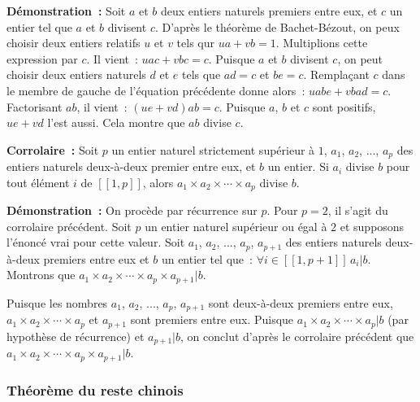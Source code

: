 \medskip

\noindent\textbf{Démonstration :} 
    Soit $a$ et $b$ deux entiers naturels premiers entre eux, et $c$ un entier tel que $a$ et $b$ divisent $c$.
    D'après le théorème de Bachet-Bézout, on peux choisir deux entiers relatifs $u$ et $v$ tels qur $u a + v b = 1$. 
    Multiplions cette expression par $c$. Il vient : $u a c + v b c = c$. 
    Puisque $a$ et $b$ divisent $c$, on peut choisir deux entiers naturels $d$ et $e$ tels que $a d = c$ et $b e = c$. 
    Remplaçant $c$ dans le membre de gauche de l'équation précédente donne alors : $u a b e + v b a d = c$. 
    Factorisant $a b$, il vient : $(u e + v d) a b = c$. 
    Puisque $a$, $b$ et $c$ sont positifs, $u e + v d$ l'est aussi. 
    Cela montre que $a b$ divise $c$. 

\done

\medskip 

\noindent\textbf{Corrolaire :} Soit $p$ un entier naturel strictement supérieur à $1$, $a_1$, $a_2$, ..., $a_p$ des entiers naturels deux-à-deux premier entre eux, et $b$ un entier. Si $a_i$ divise $b$ pour tout élément $i$ de $[\![1,p]\!]$, alors $a_1 \times a_2 \times \cdots \times a_p$ divise $b$.

\medskip

\noindent\textbf{Démonstration :} On procède par récurrence sur $p$. 
    Pour $p = 2$, il s'agit du corrolaire précédent.
    Soit $p$ un entier naturel supérieur ou égal à $2$ et supposons l'énoncé vrai pour cette valeur. 
    Soit $a_1$, $a_2$, ..., $a_p$, $a_{p+1}$ des entiers naturels deux-à-deux premiers entre eux et $b$ un entier tel que : $\forall i \in [\![1, p+1]\!] \, a_i \vert b$. 
    Montrons que $a_1 \times a_2 \times \cdots \times a_p \times a_{p+1} \vert b$.

    Puisque les nombres $a_1$, $a_2$, ..., $a_p$, $a_{p+1}$ sont deux-à-deux premiers entre eux, $a_1 \times a_2 \times \cdots \times a_p$ et $a_{p+1}$ sont premiers entre eux. 
    Puisque $a_1 \times a_2 \times \cdots \times a_p \vert b$ (par hypothèse de récurrence) et $a_{p+1} \vert b$, on conclut d'après le corrolaire précédent que $a_1 \times a_2 \times \cdots \times a_p \times a_{p+1} \vert b$.

    \done

\done

\subsubsection{Théorème du reste chinois}

